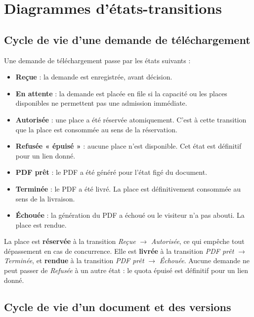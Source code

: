 \section{Diagrammes d'états-transitions}

\subsection{Cycle de vie d'une demande de téléchargement}
\label{sec:cycle-vie-demande}

Une demande de téléchargement passe par les états suivants :

\begin{itemize}
    \item \textbf{Reçue} : la demande est enregistrée, avant décision.
    \item \textbf{En attente} : la demande est placée en file si la capacité ou les places disponibles ne permettent pas une admission immédiate.
    \item \textbf{Autorisée} : une place a été réservée atomiquement. C'est à cette transition que la place est consommée au sens de la réservation.
    \item \textbf{Refusée « épuisé »} : aucune place n'est disponible. Cet état est définitif pour un lien donné.
    \item \textbf{PDF prêt} : le PDF a été généré pour l'état figé du document.
    \item \textbf{Terminée} : le PDF a été livré. La place est définitivement consommée au sens de la livraison.
    \item \textbf{Échouée} : la génération du PDF a échoué ou le visiteur n'a pas abouti. La place est rendue.
\end{itemize}

\begin{infobox}
La place est \textbf{réservée} à la transition \textit{Reçue} $\to$ \textit{Autorisée}, ce qui empêche tout dépassement en cas de concurrence. Elle est \textbf{livrée} à la transition \textit{PDF prêt} $\to$ \textit{Terminée}, et \textbf{rendue} à la transition \textit{PDF prêt} $\to$ \textit{Échouée}. Aucune demande ne peut passer de \textit{Refusée} à un autre état : le quota épuisé est définitif pour un lien donné.
\end{infobox}

\subsection{Cycle de vie d'un document et des versions}

